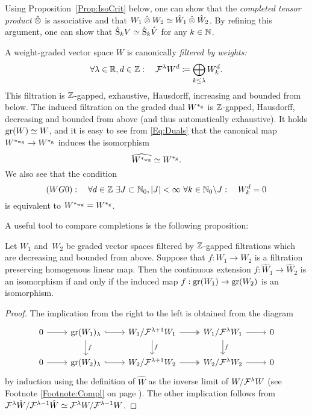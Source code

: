 \documentclass[\MainFolder/Text.tex]{subfiles}
\begin{document}
\begin{Remark}\label{Rem:ComplTens}
Using Proposition~\ref{Prop:IsoCrit} below, one can show that the \emph{completed tensor product} $\COtimes$ is associative and that $W_1 \COtimes W_2 \simeq \hat{W}_1 \COtimes \hat{W}_2$. By refining this argument, one can show that $\hat{\mathrm{S}}_k V \simeq \hat{\mathrm{S}}_k\hat{V}$ for any $k\in \mathbb{N}$.
\end{Remark}

A weight-graded vector space $W$ is canonically \emph{filtered by weights:}
\begin{equation}\label{Eq:FiltrWeights}
\forall \lambda\in \mathbb{R}, d\in \mathbb{Z}:\quad\mathcal{F}^\lambda W^d \coloneqq \bigoplus_{k\le \lambda} W_k^d.
\end{equation}
This filtration is $\mathbb{Z}$-gapped, exhaustive, Hausdorff, increasing and bounded from below. The induced filtration on the graded dual $W^{*_{\mathrm{g}}}$ is $\mathbb{Z}$-gapped, Hausdorff, decreasing and bounded from above (and thus automatically exhaustive). It holds $\operatorname{\mathrm{gr}}(W) \simeq W$, and it is easy to see from \eqref{Eq:Duals} that the canonical map $W^{*_{\mathrm{wg}}} \rightarrow W^{*_{\mathrm{g}}}$ induces the isomorphism
$$ \widehat{W^{*_{\mathrm{wg}}}} \simeq W^{*_{\mathrm{g}}}. $$
We also see that the condition
$$ (WG0): \quad \forall d\in \mathbb{Z}\ \exists J\subset \mathbb{N}_0, |J|<\infty\ \forall k\in \mathbb{N}_0\backslash J: \quad W_k^d = 0 $$
is equivalent to $W^{*_{\mathrm{wg}}}= W^{*_{\mathrm{g}}}$.

A useful tool to compare completions is the following proposition:

\begin{Proposition}\label{Prop:IsoCrit}
Let $W_1$ and~$W_2$ be graded vector spaces filtered by $\mathbb{Z}$-gapped filtrations which are decreasing and bounded from above. Suppose that $f: W_1 \rightarrow W_2$ is a filtration preserving homogenous linear map. Then the continuous extension $f: \hat{W}_1 \rightarrow \hat{W}_2$ is an isomorphism if and only if the induced map $f: \operatorname{\mathrm{gr}}(W_1) \rightarrow \operatorname{\mathrm{gr}}(W_2)$ is an isomorphism.
\end{Proposition}
\begin{proof}
The implication from the right to the left is obtained from the diagram 
$$\begin{tikzcd}
0 \arrow{r} & \Gr(W_1)_\lambda \arrow[hook]{r} \arrow{d}{f} & W_1/\Filtr^{\lambda + 1}W_1 \arrow[two heads]{r} \arrow{d}{f} & W_1/\Filtr^{\lambda} W_1 \arrow{r}   \arrow{d}{f} & 0 \\
0 \arrow{r} & \Gr(W_2)_\lambda \arrow[hook]{r} & W_2/\Filtr^{\lambda+1}W_2 \arrow[two heads]{r} & \arrow{r}W_2/\Filtr^{\lambda} W_2   & 0
\end{tikzcd}$$
by induction using the definition of $\hat{W}$ as the inverse limit of $W/\mathcal{F}^\lambda W$ (see Footnote \ref{Footnote:Compl} on page \pageref{Footnote:Compl}). The other implication follows from $\mathcal{F}^\lambda\hat{W}/\mathcal{F}^{\lambda-1}\hat{W}\simeq\mathcal{F}^\lambda W/\mathcal{F}^{\lambda-1}W$.
\end{proof}
\end{document}
